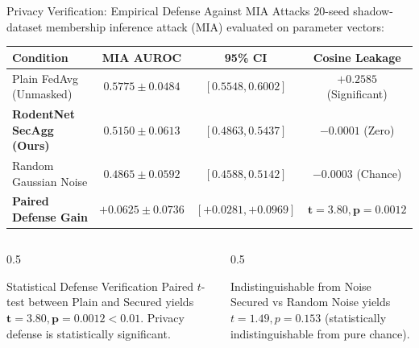 \documentclass[aspectratio=169,10pt]{beamer}
\begin{document}
\begin{frame}{Privacy Verification: Empirical Defense Against MIA Attacks}
  \small
  20-seed shadow-dataset membership inference attack (MIA) evaluated on parameter vectors:
  \vspace{0.1cm}
  \begin{table}[h]
    \centering
    \scriptsize
    \begin{tabular}{@{}lccc@{}}
      \toprule
      \textbf{Condition} & \textbf{MIA AUROC} & \textbf{95\% CI} & \textbf{Cosine Leakage} \\
      \midrule
      Plain FedAvg (Unmasked)  & $0.5775 \pm 0.0484$ & $[0.5548, 0.6002]$ & $+0.2585$ (Significant) \\
      \textbf{RodentNet SecAgg (Ours)} & $\mathbf{0.5150 \pm 0.0613}$ & $[0.4863, 0.5437]$ & $\mathbf{-0.0001}$ (Zero) \\
      Random Gaussian Noise    & $0.4865 \pm 0.0592$ & $[0.4588, 0.5142]$ & $-0.0003$ (Chance) \\
      \midrule
      \textbf{Paired Defense Gain} & $\mathbf{+0.0625 \pm 0.0736}$ & $[+0.0281, +0.0969]$ & $\mathbf{t = 3.80, p = 0.0012}$ \\
      \bottomrule
    \end{tabular}
  \end{table}
  \begin{columns}[T]
    \begin{column}{0.5\textwidth}
      \begin{exampleblock}{Statistical Defense Verification}
        \scriptsize
        Paired $t$-test between Plain and Secured yields $\mathbf{t = 3.80, p = 0.0012 < 0.01}$. Privacy defense is statistically significant.
      \end{exampleblock}
    \end{column}
    \begin{column}{0.5\textwidth}
      \begin{exampleblock}{Indistinguishable from Noise}
        \scriptsize
        Secured vs Random Noise yields $t = 1.49, p = 0.153$ (statistically indistinguishable from pure chance).
      \end{exampleblock}
    \end{column}
  \end{columns}
\end{frame}
\end{document}
